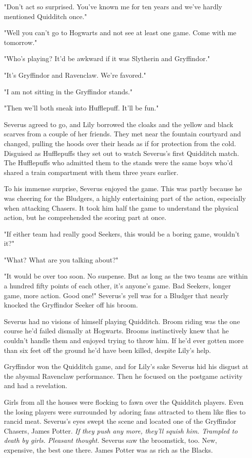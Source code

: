 \documentclass[a4paper,11pt]{article}
\begin{document}
"Don't act so surprised. You've known me for ten years and we've hardly mentioned Quidditch once."

"Well you can't go to Hogwarts and not see at least one game. Come with me tomorrow."

"Who's playing? It'd be awkward if it was Slytherin and Gryffindor."

"It's Gryffindor and Ravenclaw. We're favored."

"I am not sitting in the Gryffindor stands."

"Then we'll both sneak into Hufflepuff. It'll be fun."

Severus agreed to go, and Lily borrowed the cloaks and the yellow and black scarves from a couple of her friends. They met near the fountain courtyard and changed, pulling the hoods over their heads as if for protection from the cold. Disguised as Hufflepuffs they set out to watch Severus's first Quidditch match. The Hufflepuffs who admitted them to the stands were the same boys who'd shared a train compartment with them three years earlier.

To his immense surprise, Severus enjoyed the game. This was partly because he was cheering for the Bludgers, a highly entertaining part of the action, especially when attacking Chasers. It took him half the game to understand the physical action, but he comprehended the scoring part at once.

"If either team had really good Seekers, this would be a boring game, wouldn't it?"

"What? What are you talking about?"

"It would be over too soon. No suspense. But as long as the two teams are within a hundred fifty points of each other, it's anyone's game. Bad Seekers, longer game, more action. Good one!" Severus's yell was for a Bludger that nearly knocked the Gryffindor Seeker off his broom.

Severus had no visions of himself playing Quidditch. Broom riding was the one course he'd failed dismally at Hogwarts. Brooms instinctively knew that he couldn't handle them and enjoyed trying to throw him. If he'd ever gotten more than six feet off the ground he'd have been killed, despite Lily's help.

Gryffindor won the Quidditch game, and for Lily's sake Severus hid his disgust at the abysmal Ravenclaw performance. Then he focused on the postgame activity and had a revelation.

Girls from all the houses were flocking to fawn over the Quidditch players. Even the losing players were surrounded by adoring fans attracted to them like flies to rancid meat. Severus's eyes swept the scene and located one of the Gryffindor Chasers, James Potter. \emph{If they push any more, they'll squish him. Trampled to death by girls. Pleasant thought.} Severus saw the broomstick, too. New, expensive, the best one there. James Potter was as rich as the Blacks.
\end{document}

